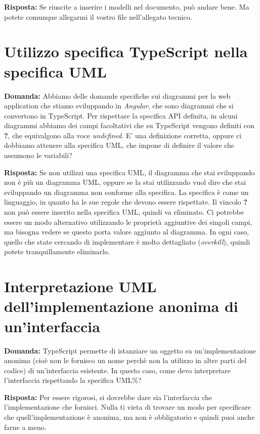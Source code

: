 \documentclass{article}
\begin{document}
\textbf{Risposta:} Se riuscite a inserire i modelli nel documento, può andare bene. Ma potete comunque allegarmi il vostro file nell'allegato tecnico.

\section{Utilizzo specifica TypeScript nella specifica UML}%
\label{sec:utilizzo_specifica_typescript_in_specifica_uml}

\textbf{Domanda:} Abbiamo delle domande specifiche sui diagrammi per la web application che stiamo sviluppando in \textit{Angular}, che sono diagrammi che si convertono in TypeScript. Per rispettare la specifica API definita, in alcuni diagrammi abbiamo dei campi facoltativi che su TypeScript vengono definiti con \textbf{?}, che equivalgono alla voce \textit{undefined}. E' una definizione corretta, oppure ci dobbiamo attenere alla specifica UML, che impone di definire il valore che assumono le variabili?

\textbf{Risposta:} Se non utilizzi una specifica UML, il diagramma che stai sviluppando non è più un diagramma UML, oppure se la stai utilizzando vuol dire che stai sviluppando un diagramma non conforme alla specifica. La specifica è come un linguaggio, in quanto ha le sue regole che devono essere rispettate. Il vincolo \textbf{?} non può essere inserito nella specifica UML, quindi va eliminato. Ci potrebbe essere un modo alternativo utilizzando le proprietà aggiuntive dei singoli campi, ma bisogna vedere se questo porta valore aggiunto al diagramma. In ogni caso, quello che state cercando di implementare è molto dettagliato (\textit{overkill}), quindi potete tranquillamente eliminarlo.

\section{Interpretazione UML dell'implementazione anonima di un'interfaccia}%
\label{sec:Interpretazione_uml_implementazione_anonima_interfaccia}

\textbf{Domanda:} TypeScript permette di istanziare un oggetto su un'implementazione anonima (cioè non le fornisco un nome perchè non la utilizzo in altre parti del codice) di un'interfaccia esistente. In questo caso, come devo interpretare l'interfaccia rispettando la specifica UML\%?

\textbf{Risposta:} Per essere rigorosi, si dovrebbe dare sia l'interfaccia che l'implementazione che fornisci. Nulla ti vieta di trovare un modo per specificare che quell'implementazione è anonima, ma non è obbligatorio e quindi puoi anche farne a meno.
\end{document}
